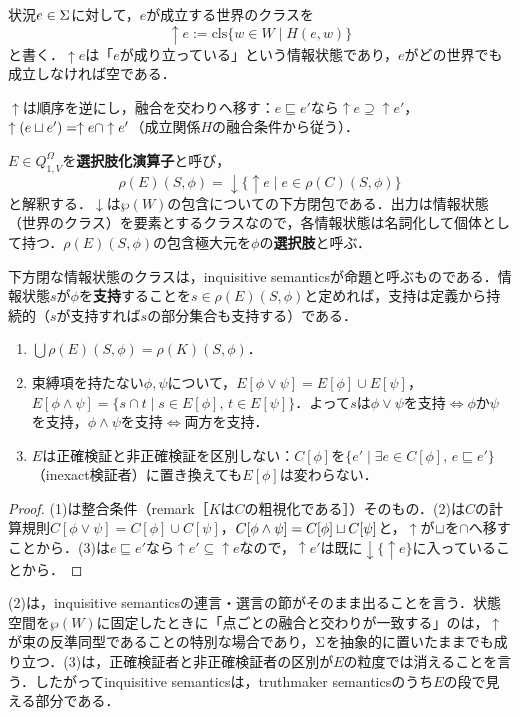 \documentclass[../../main-detail.tex]{subfiles}
\begin{document}
\begin{definition}[状況の世界化]
    状況$e \in \Sigma$に対して，$e$が成立する世界のクラスを
    \[
        \uparrow e := \mathrm{cls}\{w \in W \mid H(e,w)\}
    \]
    と書く．$\uparrow e$は「$e$が成り立っている」という情報状態であり，$e$がどの世界でも成立しなければ空である．
\end{definition}
$\uparrow$は順序を逆にし，融合を交わりへ移す：$e \sqsubseteq e'$なら$\uparrow e \supseteq \uparrow e'$，$\uparrow(e \sqcup e') = \uparrow e \cap \uparrow e'$（成立関係$H$の融合条件から従う）．
\begin{definition}[冠詞$E$]
    $E \in Q^\Omega_{1,V}$を\textbf{選択肢化演算子}と呼び，
    \[
        \rho(E)(S,\phi) = {\downarrow}\{\uparrow e \mid e \in \rho(C)(S,\phi)\}
    \]
    と解釈する．${\downarrow}$は$\wp(W)$の包含についての下方閉包である．出力は情報状態（世界のクラス）を要素とするクラスなので，各情報状態は名詞化して個体として持つ．$\rho(E)(S,\phi)$の包含極大元を$\phi$の\textbf{選択肢}と呼ぶ．
\end{definition}
下方閉な情報状態のクラスは，inquisitive semanticsが命題と呼ぶものである\cite{inquisitive}．情報状態$s$が$\phi$を\textbf{支持}することを$s \in \rho(E)(S,\phi)$と定めれば，支持は定義から持続的（$s$が支持すれば$s$の部分集合も支持する）である．

\begin{proposition}[$E$は$C$と$K$の間にある]
    \leavevmode
    \begin{enumerate}[label=(\arabic*)]
        \item $\bigcup \rho(E)(S,\phi) = \rho(K)(S,\phi)$．
        \item 束縛項を持たない$\phi,\psi$について，$E[\phi\lor\psi] = E[\phi]\cup E[\psi]$，$E[\phi\land\psi] = \{s\cap t \mid s\in E[\phi],\,t\in E[\psi]\}$．よって$s$は$\phi\lor\psi$を支持$\iff$$\phi$か$\psi$を支持，$\phi\land\psi$を支持$\iff$両方を支持．
        \item $E$は正確検証と非正確検証を区別しない：$C[\phi]$を$\{e' \mid \exists e \in C[\phi],\, e \sqsubseteq e'\}$（inexact検証者）に置き換えても$E[\phi]$は変わらない．
    \end{enumerate}
\end{proposition}
\begin{proof}
    (1)は整合条件（remark［$K$は$C$の粗視化である］）そのもの．(2)は$C$の計算規則$C[\phi\lor\psi]=C[\phi]\cup C[\psi]$，$C[\phi\land\psi]=C[\phi]\sqcup C[\psi]$と，$\uparrow$が$\sqcup$を$\cap$へ移すことから．(3)は$e\sqsubseteq e'$なら$\uparrow e' \subseteq \uparrow e$なので，$\uparrow e'$は既に${\downarrow}\{\uparrow e\}$に入っていることから．
\end{proof}
(2)は，inquisitive semanticsの連言・選言の節がそのまま出ることを言う．状態空間を$\wp(W)$に固定したときに「点ごとの融合と交わりが一致する」のは，$\uparrow$が束の反準同型であることの特別な場合であり，$\Sigma$を抽象的に置いたままでも成り立つ．(3)は，正確検証者と非正確検証者の区別が$E$の粒度では消えることを言う．したがってinquisitive semanticsは，truthmaker semanticsのうち$E$の段で見える部分である．
\end{document}

